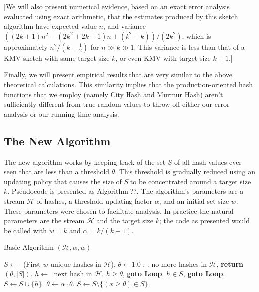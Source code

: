 \documentclass{sig-alternate}
\begin{document}
[We will also present numerical evidence, based on an exact error
analysis evaluated using exact arithmetic, that the estimates produced
by this sketch algorithm have expected value $n$, and variance
$((2k+1)n^2 - (2k^2+2k+1)n + (k^2+k))/(2k^2)$, which is approximately
$n^2/(k-\frac{1}{2})$ for $n \gg k \gg 1$.
This variance is less than that of a KMV sketch with same target size $k$, 
or even KMV with target size $k+1$.]

Finally, we will present empirical results that are very
similar to the above theoretical calculations. This similarity
implies that the production-oriented hash functions that we employ
(namely City Hash and Murmur Hash) aren't sufficiently different from
true random values to throw off either our error analysis or our running
time analysis. 


\subsection{The New Algorithm}

The new algorithm works by keeping track of the set
$S$ of all hash values ever seen that are less than a threshold
$\theta$. This threshold is gradually reduced using an updating policy
that causes the size of $S$ to be concentrated around a
target size $k$. Pseudocode is presented as Algorithm ??. The algorithm's parameters are a
stream $\mathcal{H}$ of hashes, a threshold updating factor $\alpha$, 
and an initial set size $w$. These parameters were chosen to facilitate
analysis. In practice the natural parameters are the stream $\mathcal{H}$ and 
the target size $k$; the code as presented would be called with $w=k$ and 
$\alpha = k/(k+1)$.

\begin{algorithm}[t]
\caption{Basic Algorithm $(\mathcal{H},\alpha,w)$}
\label{alg:basic-algorithm}
\begin{algorithmic}[1]{\footnotesize
\STATE $S \leftarrow\;$ (First $w$ unique hashes in $\mathcal{H}$).
\STATE $ \theta \leftarrow 1.0 $
\STATE {}.
\STATE {}.
 no more hashes in $\mathcal{H}$, {\bf return} $(\theta,|S|)$.
\STATE $h \leftarrow\;$ next hash in $\mathcal{H}$.
 $h \ge \theta$, {\bf goto Loop}.
 $h \in S$, {\bf goto Loop}.
\STATE $S \leftarrow S \cup \{h\}$.
\STATE $\theta \leftarrow \alpha \cdot \theta$.
\STATE $S \leftarrow S \setminus \{(x \ge \theta) \in S\}$.
}\end{algorithmic}
\end{algorithm}
\end{document}
